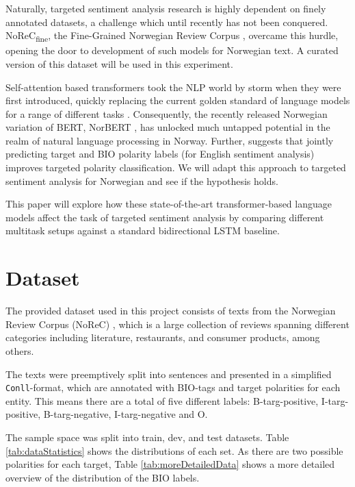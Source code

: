 \documentclass[11pt,a4paper]{article}
\begin{document}
Naturally, targeted sentiment analysis research is highly dependent on finely annotated datasets, a challenge which until recently has not been conquered. 
NoReC\textsubscript{fine}, the Fine-Grained Norwegian Review Corpus \cite{NRCFINE}, overcame this hurdle, opening the door to development of such models for Norwegian text. 
A curated version of this dataset will be used in this experiment.


Self-attention based transformers took the NLP world by storm when they were first introduced, quickly replacing the current golden standard of language models for a range of different tasks \cite{devlin-etal-2019-bert}. Consequently, the recently released Norwegian variation of BERT, NorBERT \cite{NORBERT}, has unlocked much untapped potential in the realm of natural language processing in Norway. Further, \citealt{FLAUNT} suggests that jointly predicting target and BIO polarity labels (for English sentiment analysis) improves targeted polarity classification. We will adapt this approach to targeted sentiment analysis for Norwegian and see if the hypothesis holds. 

This paper will explore how these state-of-the-art transformer-based language models affect the task of targeted sentiment analysis by comparing different multitask setups against a standard bidirectional LSTM baseline.




\section{Dataset}

The provided dataset used in this project consists of texts from the Norwegian Review Corpus (NoReC) \cite{NRCFINE}, which is a large collection of reviews spanning different categories including literature, restaurants, and consumer products, among others.

The texts were preemptively split into sentences and presented in a simplified \texttt{Conll}-format, which are annotated with BIO-tags and target polarities for each entity. This means there are a total of five different labels: B-targ-positive, I-targ-positive, B-targ-negative, I-targ-negative and O.


The sample space was split into train, dev, and test datasets. Table \ref{tab:dataStatistics} shows the distributions of each set. As there are two possible polarities for each target, Table \ref{tab:moreDetailedData} shows a more detailed overview of the distribution of the BIO labels.
\end{document}
